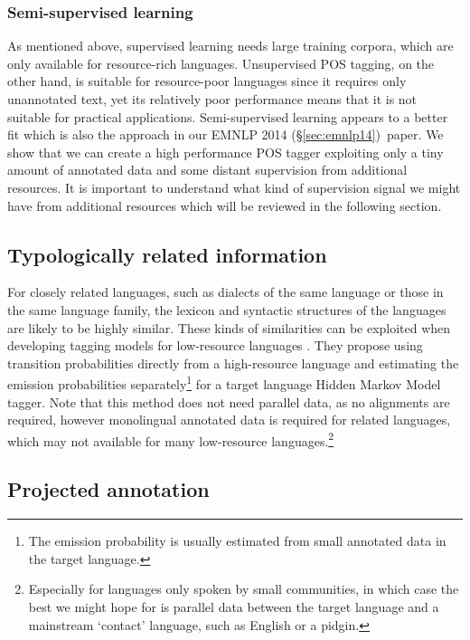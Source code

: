 \documentclass[12pt,twoside,final,hidelinks]{ltthesis}
\theoremstyle{definition}
\newcommand\emnlpiv{EMNLP 2014 (\S\ref{sec:emnlp14})}
\begin{document}
\subsubsection{Semi-supervised learning}
As mentioned above, supervised learning needs large training corpora, 
which are only available for resource-rich languages. Unsupervised POS tagging, on the other hand, is suitable for resource-poor languages since it requires only unannotated text, yet its relatively poor performance means that it is not suitable for practical applications. 
Semi-supervised learning appears to a better fit which is also the approach in our \emnlpiv\ paper. We show that we can create a high performance POS tagger exploiting only a tiny amount of annotated data and some distant supervision from additional resources. It is important to understand what kind of supervision signal we might have from additional resources which will be reviewed in the following section. 

\subsection{Typologically related information}

For closely related languages, such as dialects of the same language or those in the same language family, the lexicon and syntactic structures of the languages are likely to be highly similar. These kinds of similarities can be exploited when developing tagging models for low-resource languages \cite{Hana04,Feldman06,reddy2011crosspos}. They propose using transition probabilities directly from a high-resource language and estimating the emission probabilities separately\footnote{The emission probability is usually estimated from small annotated data in the target language.} for a target language Hidden Markov Model tagger. Note that this method does not need parallel data, as no alignments are required, however monolingual annotated data is required for related languages, which may not available for many low-resource languages.\footnote{Especially for languages only spoken by small communities, in which case the best we might hope for is parallel data between the target language and a mainstream `contact' language, such as English or a pidgin.}  

\subsection{Projected annotation}
\end{document}
